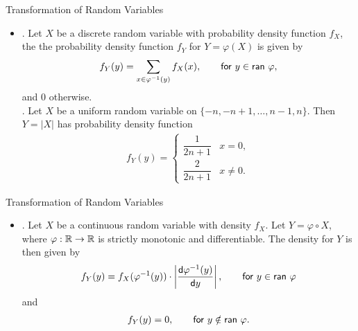 \begin{frame}{Transformation of Random Variables}

\begin{itemize}
	\justifying
	\item {}. Let $X$ be a discrete random variable with probability density function $f_X$, the the probability density function $f_Y$ for $Y = \varphi(X)$ is given by
	\begin{align*}
	f_Y(y) = \sum_{x\in \varphi^{-1}(y)} f_X(x), \qquad \mathsf{for\ } y\in \mathsf{ran}\ \varphi,
	\end{align*}
	and 0 otherwise.\\
	. Let $X$ be a uniform random variable on $\{-n, -n+1, \ldots, n-1, n\}$. Then $Y = |X|$ has probability density function
	\begin{align*}
	f_Y(y) = \left\{
	\begin{array}{ll}
	\dfrac{1}{2n+1} & x = 0, \\
	\dfrac{2}{2n+1} & x\neq 0.
	\end{array}
	\right.
	\end{align*}
\end{itemize}


\end{frame}


\begin{frame}{Transformation of Random Variables}


\begin{itemize}
\justifying
\item {}. Let $X$ be a continuous random variable with density $f_X$. Let $Y = \varphi\circ X$, where $\varphi: \mathbb{R}\rightarrow \mathbb{R}$ is strictly monotonic and differentiable. The density for $Y$ is then given by
\begin{align*}
f_Y(y) = f_X(\varphi^{-1}(y))\cdot \left|\frac{\mathsf{d}\varphi^{-1}(y)}{\mathsf{d}y} \right|, \qquad \mathsf{for\ } y\in \mathsf{ran\ }\varphi
\end{align*}
and 
\begin{align*}
f_Y(y) = 0, \qquad \mathsf{for\ } y\notin \mathsf{ran\ } \varphi.
\end{align*}
\end{itemize}


\end{frame}



